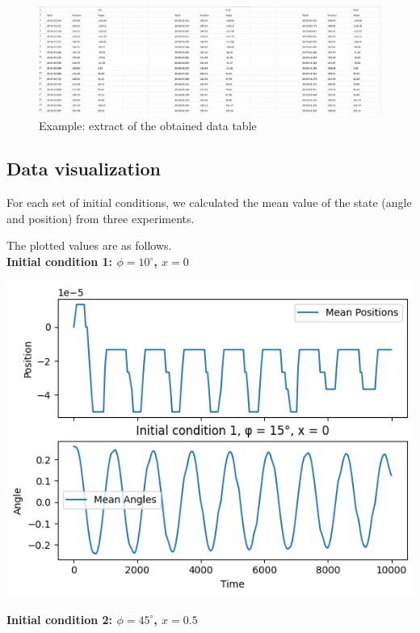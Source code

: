 \documentclass{article}
\begin{document}
\begin{figure}[h]
  \centering
  \includegraphics[scale=0.21]{data/measurements.png}
  \caption{Example: extract of the obtained data table}
\end{figure}

\subsection{Data visualization}
For each set of initial conditions, we calculated the mean value of the state (angle and position) from three experiments. 

The plotted values are as follows.\\

\textbf{Initial condition 1: $\phi = 10^\circ$, $x = 0$}

\includegraphics*[scale=0.7]{plots/init1!.png}

\textbf{Initial condition 2: $\phi = 45^\circ$, $x = 0.5$}
\end{document}
